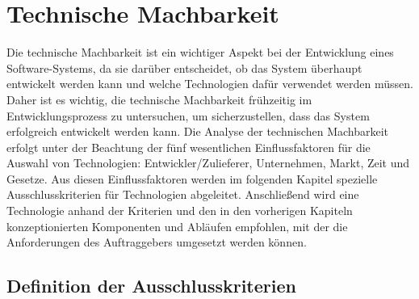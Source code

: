 \section{Technische Machbarkeit}

Die technische Machbarkeit ist ein wichtiger Aspekt bei der Entwicklung eines Software-Systems, da sie darüber entscheidet, ob das System überhaupt entwickelt werden kann und welche Technologien dafür verwendet werden müssen. 
Daher ist es wichtig, die technische Machbarkeit frühzeitig im Entwicklungsprozess zu untersuchen, um sicherzustellen, dass das System erfolgreich entwickelt werden kann.
Die Analyse der technischen Machbarkeit erfolgt unter der Beachtung der fünf wesentlichen Einflussfaktoren für die Auswahl von Technologien: Entwickler/Zulieferer, Unternehmen, Markt, Zeit und Gesetze.
\newparagraph
Aus diesen Einflussfaktoren werden im folgenden Kapitel spezielle Ausschlusskriterien für Technologien abgeleitet.
Anschließend wird eine Technologie anhand der Kriterien und den in den vorherigen Kapiteln konzeptionierten Komponenten und Abläufen empfohlen, mit der die Anforderungen des Auftraggebers umgesetzt werden können.

\subsection{Definition der Ausschlusskriterien}


